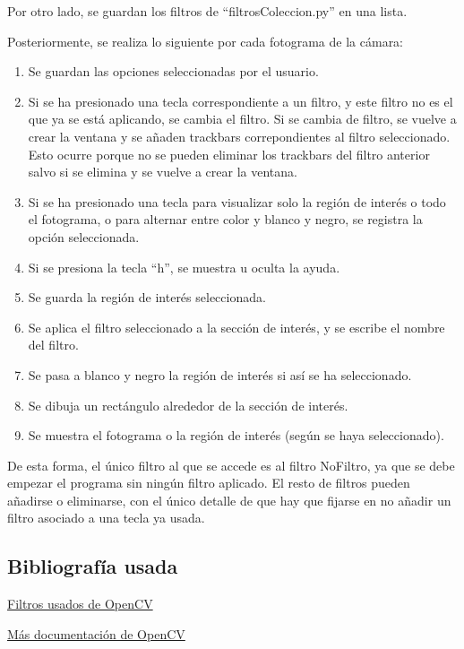 \documentclass[12pt]{article}
\begin{document}
Por otro lado, se guardan los filtros de ``filtrosColeccion.py'' en una lista.

Posteriormente, se realiza lo siguiente por cada fotograma de la cámara:

\begin{enumerate}
    \item Se guardan las opciones seleccionadas por el usuario.
    \item Si se ha presionado una tecla correspondiente a un filtro, y este filtro no es el que ya se está aplicando, se cambia el filtro. Si se cambia de filtro, se vuelve a crear la ventana y se añaden trackbars correpondientes al filtro seleccionado. Esto ocurre porque no se pueden eliminar los trackbars del filtro anterior salvo si se elimina y se vuelve a crear la ventana.
    \item Si se ha presionado una tecla para visualizar solo la región de interés o todo el fotograma, o para alternar entre color y blanco y negro, se registra la opción seleccionada.
    \item Si se presiona la tecla ``h'', se muestra u oculta la ayuda.
    \item Se guarda la región de interés seleccionada.
    \item Se aplica el filtro seleccionado a la sección de interés, y se escribe el nombre del filtro.
    \item Se pasa a blanco y negro la región de interés si así se ha seleccionado.
    \item  Se dibuja un rectángulo alrededor de la sección de interés.
    \item Se muestra el fotograma o la región de interés (según se haya seleccionado).
\end{enumerate}

De esta forma, el único filtro al que se accede es al filtro NoFiltro, ya que se debe empezar el programa sin ningún filtro aplicado. El resto de filtros pueden añadirse o eliminarse, con el único detalle de que hay que fijarse en no añadir un filtro asociado a una tecla ya usada.

\subsection*{Bibliografía usada}

\href{https://docs.opencv.org/4.x/d4/d13/tutorial_py_filtering.html}{Filtros usados de OpenCV}

\href{https://docs.opencv.org/4.x/d4/d86/group__imgproc__filter.html#ga564869aa33e58769b4469101aac458f9}{Más documentación de OpenCV}
\end{document}
